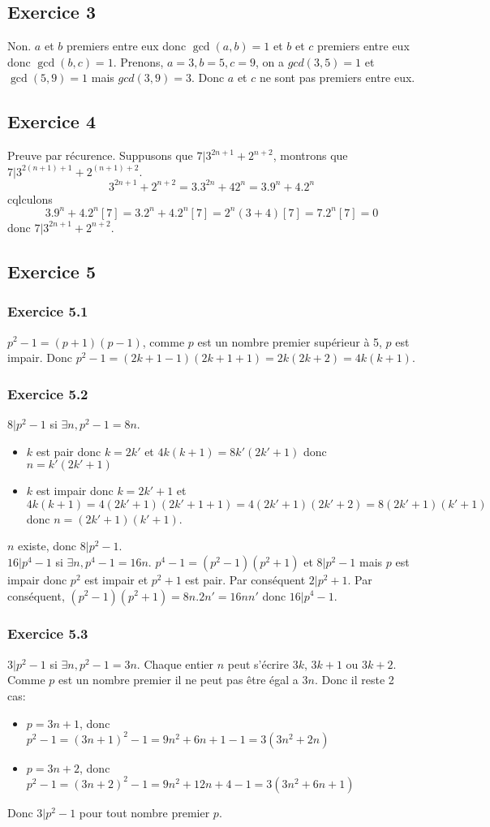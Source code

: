 \documentclass[]{book}
\theoremstyle{definition}
\begin{document}
\subsection*{Exercice 3}
Non. $a$ et $b$ premiers entre eux donc $\gcd(a,b) = 1$ et $b$ et $c$ premiers entre eux donc $\gcd(b,c) = 1$. Prenons, $a=3, b=5, c=9$, on a $gcd(3,5) = 1$ et $\gcd(5,9) = 1$ mais $gcd(3,9) = 3$. Donc $a$ et $c$ ne sont pas premiers entre eux.

\subsection*{Exercice 4}
Preuve par r\'ecurence. Suppusons que $7| 3^{2n+1} + 2^{n+2}$, montrons que $7| 3^{2(n+1)+1} + 2^{(n+1)+2}$.
$$
3^{2n+1} + 2^{n+2} = 3.3^{2n} + 42^{n} = 3.9^n + 4.2^n
$$
cqlculons 
$$
3.9^n + 4.2^n [7] = 3.2^n + 4.2^n [7] = 2^n(3+4) [7] = 7.2^n [7] = 0
$$
donc $7 | 3^{2n+1} + 2^{n+2}$.

\subsection*{Exercice 5}
\subsubsection*{Exercice 5.1}
$p^2 -1 = (p+1)(p-1)$, comme $p$ est un nombre premier sup\'erieur \`a 5, $p$ est impair. Donc $p^2 - 1 = (2k+1-1)(2k+1+1) = 2k(2k+2) = 4k(k+1)$.

\subsubsection*{Exercice 5.2}
$8 | p^2-1$ si $\exists n, p^2-1 = 8n$. 
\begin{itemize}
\item $k$ est pair donc $k=2k'$ et $4k(k+1) = 8k'(2k'+1)$ donc $n = k'(2k'+1)$
\item $k$ est impair donc $k=2k'+1$ et $4k(k+1) = 4(2k'+1)(2k'+1+1) = 4(2k'+1)(2k'+2) = 8(2k'+1)(k'+1)$ donc $n=(2k'+1)(k'+1)$.
\end{itemize}
$n$ existe, donc $8 | p^2 - 1$.\\

$16 | p^4-1$ si $\exists n, p^4-1 = 16n$. 
$p^4-1 = (p^2-1)(p^2+1)$ et $8 | p^2 -1$ mais $p$ est impair donc $p^2$ est impair et $p^2+1$ est pair. Par cons\'equent $2 | p^2 + 1$. Par cons\'equent, $(p^2-1)(p^2+1) = 8n.2n' = 16nn'$ donc $16 | p^4-1$.

\subsubsection*{Exercice 5.3}
$3 | p^2-1$ si $\exists n, p^2-1 = 3n$. 
Chaque entier $n$ peut s'\'ecrire $3k$, $3k+1$ ou $3k+2$. Comme $p$ est un nombre premier il ne peut pas \^etre \'egal a $3n$. Donc il reste 2 cas:
\begin{itemize}
\item $p = 3n+1$, donc $p^2-1 = (3n+1)^2 -1 = 9n^2+6n+1 -1 = 3(3n^2+2n)$
\item $p = 3n+2$, donc $p^2-1 = (3n+2)^2 -1 = 9n^2+12n+4 -1 = 3(3n^2+6n+1)$
\end{itemize}
Donc $3|p^2 -1$ pour tout nombre premier $p$.
\end{document}
